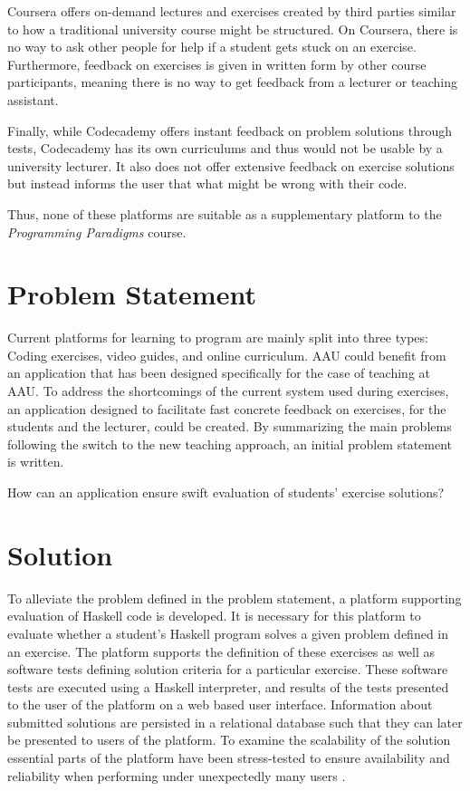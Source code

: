 Coursera offers on-demand lectures and exercises created by third parties similar to how a traditional university course might be structured.
On Coursera, there is no way to ask other people for help if a student gets stuck on an exercise.
Furthermore, feedback on exercises is given in written form by other course participants, meaning there is no way to get feedback from a lecturer or teaching assistant.


Finally, while Codecademy offers instant feedback on problem solutions through tests, Codecademy has its own curriculums and thus would not be usable by a university lecturer.
It also does not offer extensive feedback on exercise solutions but instead informs the user that what might be wrong with their code.


Thus, none of these platforms are suitable as a supplementary platform to the \textit{Programming Paradigms} course.
\section{Problem Statement}
Current platforms for learning to program are mainly split into three types: Coding exercises, video guides, and online curriculum.
AAU could benefit from an application that has been designed specifically for the case of teaching at AAU.
To address the shortcomings of the current system used during exercises, an application designed to facilitate fast concrete feedback on exercises, for the students and the lecturer, could be created.
By summarizing the main problems following the switch to the new teaching approach, an initial problem statement is written.
\begin{displayquote}
    How can an application ensure swift evaluation of students' exercise solutions?
\end{displayquote}

\section{Solution}
To alleviate the problem defined in the problem statement, a platform supporting evaluation of Haskell code is developed. It is necessary for this platform to evaluate whether a student's Haskell program solves a given problem defined in an exercise. The platform supports the definition of these exercises as well as software tests defining solution criteria for a particular exercise. These software tests are executed using a Haskell interpreter, and results of the tests presented to the user of the platform on a web based user interface.
Information about submitted solutions are persisted in a relational database such that they can later be presented to users of the platform.
To examine the scalability of the solution essential parts of the platform have been stress-tested to ensure availability and reliability when performing under unexpectedly many users \cite{Sommerville10}.

